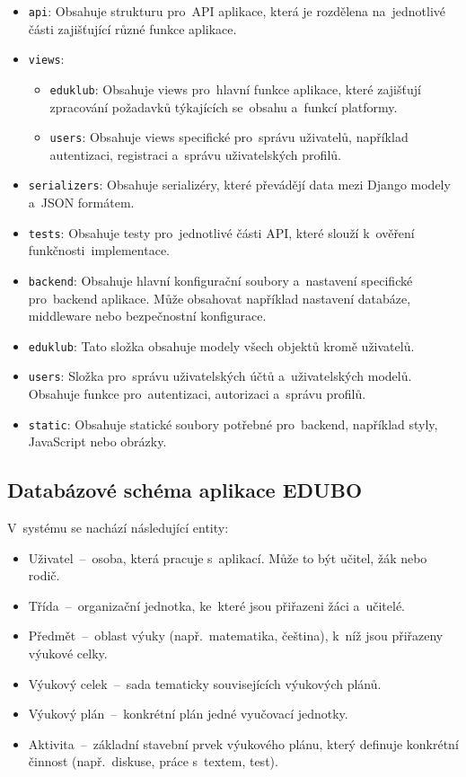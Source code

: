 \documentclass[male,czech,api_bc]{kitheses}
\begin{document}
\begin{itemize}
	\item \texttt{api}: Obsahuje strukturu pro~API aplikace, která je rozdělena na~jednotlivé části zajišťující různé funkce aplikace.
	\item \texttt{views}:
	\begin{itemize}
		\item \texttt{eduklub}: Obsahuje views pro~hlavní funkce aplikace, které zajišťují zpracování požadavků týkajících se~obsahu a~funkcí platformy.
		\item \texttt{users}: Obsahuje views specifické pro~správu uživatelů, například autentizaci, registraci a~správu uživatelských profilů.
	\end{itemize}
	\item \texttt{serializers}: Obsahuje serializéry, které převádějí data mezi Django modely a~JSON formátem.
	\item \texttt{tests}: Obsahuje testy pro~jednotlivé části API, které slouží k~ověření funkčnosti~implementace.
	\item \texttt{backend}: Obsahuje hlavní konfigurační soubory a~nastavení specifické pro~backend aplikace. Může obsahovat například nastavení databáze, middleware nebo bezpečnostní konfigurace.
	\item \texttt{eduklub}: Tato složka obsahuje modely všech objektů kromě uživatelů.
	\item \texttt{users}: Složka pro~správu uživatelských účtů a~uživatelských modelů. Obsahuje funkce pro~autentizaci, autorizaci a~správu profilů.
	\item \texttt{static}: Obsahuje statické soubory potřebné pro~backend, například styly, JavaScript nebo obrázky.
\end{itemize}

\subsection{Databázové schéma aplikace EDUBO}

V~systému se nachází následující entity:
\begin{itemize}
	\item Uživatel~--~osoba, která pracuje s~aplikací. Může to být učitel, žák nebo rodič.
	\item Třída~--~organizační jednotka, ke~které jsou přiřazeni žáci a~učitelé.
	\item Předmět~--~oblast výuky (např.~matematika, čeština), k~níž jsou přiřazeny výukové celky.
	\item Výukový celek~--~sada tematicky souvisejících výukových plánů.
	\item Výukový plán~--~konkrétní plán jedné vyučovací jednotky.
	\item Aktivita~--~základní stavební prvek výukového plánu, který definuje konkrétní činnost (např.~diskuse, práce s~textem, test).
\end{itemize}
\end{document}
